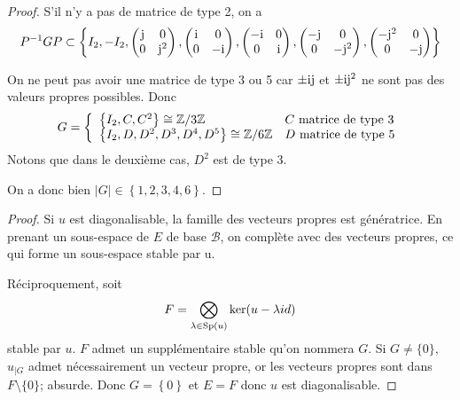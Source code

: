 \documentclass[12pt]{article}
\begin{document}
\begin{proof}
	S'il n'y a pas de matrice de type 2, on a 
	\begin{equation}
		P^{-1}GP\subset\left\lbrace I_{2},-I_{2},\begin{pmatrix}
			\mathrm{j}&0\\0&\mathrm{j}^{2}
		\end{pmatrix},\begin{pmatrix}
			\mathrm{i}&0\\0&-\mathrm{i}
		\end{pmatrix},\begin{pmatrix}
			-\mathrm{i}&0\\0&\mathrm{i}
		\end{pmatrix},\begin{pmatrix}
			-\mathrm{j}&0\\0&-\mathrm{j}^{2}
		\end{pmatrix},\begin{pmatrix}
			-\mathrm{j}^{2}&0\\0&-\mathrm{j}
		\end{pmatrix}\right\rbrace
	\end{equation}

	On ne peut pas avoir une matrice de type 3 ou 5 car $\pm\mathrm{i}\mathrm{j}$ et $\pm\mathrm{i}\mathrm{j}^{2}$ ne sont pas des valeurs propres possibles. Donc 
	\begin{equation}
		G=
		\left\lbrace
		\begin{array}[]{ll}
			\left\lbrace I_{2},C,C^{2}\right\rbrace\cong\Z/3\Z & C\text{ matrice de type 3}\\
			\left\lbrace I_{2},D,D^{2},D^{3},D^{4},D^{5}\right\rbrace\cong\Z/6\Z& D\text{ matrice de type 5}
		\end{array}
		\right.
	\end{equation}
	Notons que dans le deuxième cas, $D^{2}$ est de type 3.

	On a donc bien $\left\lvert G\right\rvert\in\left\lbrace1,2,3,4,6\right\rbrace$.
\end{proof}

\begin{proof}
	Si $u$ est diagonalisable, la famille des vecteurs propres est génératrice. En prenant un sous-espace de $E$ de base $\mathcal{B}$, on complète avec des vecteurs propres, ce qui forme un sous-espace stable par u.

	Réciproquement, soit 
	\begin{equation}
		F=\bigotimes_{\lambda\in\operatorname{Sp}(u)}\ker(u-\lambda id)
	\end{equation}
	stable par $u$. $F$ admet un supplémentaire stable qu'on nommera $G$. Si $G\neq\lbrace0\rbrace$, $u_{\mid G}$ admet nécessairement un vecteur propre, or les vecteurs propres sont dans $F\setminus\lbrace0\rbrace$; absurde. Donc $G=\left\lbrace0\right\rbrace$ et $E=F$ donc $u$ est diagonalisable.
\end{proof}
\end{document}

